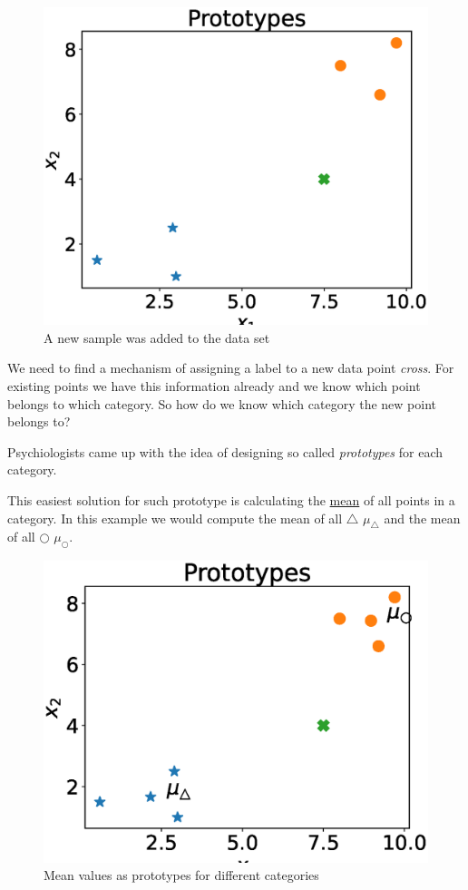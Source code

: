 \documentclass[a4paper]{article}
\begin{document}
\begin{figure}[h]
  \centering
  \includegraphics[width=.75\textwidth]{images/prototypes_1.eps}
  \caption{A new sample was added to the data set}
  \label{fig:prototypes_1}
\end{figure}

We need to find a mechanism of assigning a label to a new data point \textit{cross}.
For existing points we have this information already and we know which point belongs to which category. 
So how do we know which category the new point belongs to?

Psychiologists came up with the idea of designing so called \textit{prototypes} for each category.

This easiest solution for such prototype is calculating the \underline{mean} of all points in a category.
In this example we would compute the mean of all $\bigtriangleup$ $\mu_\bigtriangleup$ and the mean of all $\bigcirc$ $\mu_\bigcirc$.
\begin{figure}[h]
  \centering
  \includegraphics[width=.75\textwidth]{images/prototypes_2.eps}
  \caption{Mean values as prototypes for different categories}
  \label{fig:prototypes_2}
\end{figure}
\end{document}
